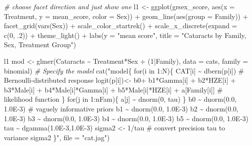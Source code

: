 \documentclass[12pt]{article}
\newenvironment{Shaded}{\begin{snugshade}}{\end{snugshade}}
\newcommand{\AttributeTok}[1]{\textcolor[rgb]{0.77,0.63,0.00}{#1}}
\newcommand{\CommentTok}[1]{\textcolor[rgb]{0.56,0.35,0.01}{\textit{#1}}}
\newcommand{\DecValTok}[1]{\textcolor[rgb]{0.00,0.00,0.81}{#1}}
\newcommand{\FunctionTok}[1]{\textcolor[rgb]{0.00,0.00,0.00}{#1}}
\newcommand{\NormalTok}[1]{#1}
\newcommand{\OtherTok}[1]{\textcolor[rgb]{0.56,0.35,0.01}{#1}}
\newcommand{\SpecialCharTok}[1]{\textcolor[rgb]{0.00,0.00,0.00}{#1}}
\newcommand{\StringTok}[1]{\textcolor[rgb]{0.31,0.60,0.02}{#1}}
\begin{document}
\begin{Shaded}
\begin{Highlighting}[]
\CommentTok{\# choose facet direction and just show one}
\NormalTok{l1 }\OtherTok{\textless{}{-}} \FunctionTok{ggplot}\NormalTok{(grsex\_score, }\FunctionTok{aes}\NormalTok{(}\AttributeTok{x =}\NormalTok{ Treatment, }\AttributeTok{y =}\NormalTok{ mean\_score, }\AttributeTok{color =}\NormalTok{ Sex)) }\SpecialCharTok{+}
  \FunctionTok{geom\_line}\NormalTok{(}\FunctionTok{aes}\NormalTok{(}\AttributeTok{group =}\NormalTok{ Family)) }\SpecialCharTok{+} \FunctionTok{facet\_grid}\NormalTok{(}\FunctionTok{vars}\NormalTok{(Sex)) }\SpecialCharTok{+}
  \FunctionTok{scale\_color\_startrek}\NormalTok{() }\SpecialCharTok{+}
  \FunctionTok{scale\_x\_discrete}\NormalTok{(}\AttributeTok{expand =} \FunctionTok{c}\NormalTok{(}\DecValTok{0}\NormalTok{, .}\DecValTok{2}\NormalTok{)) }\SpecialCharTok{+}
  \FunctionTok{theme\_light}\NormalTok{() }\SpecialCharTok{+}
  \FunctionTok{labs}\NormalTok{(}\AttributeTok{y =} \StringTok{"mean score"}\NormalTok{,}
       \AttributeTok{title =} \StringTok{"Cataracts by Family, Sex, Treatment Group"}\NormalTok{)}

\NormalTok{l1}
\NormalTok{mod }\OtherTok{\textless{}{-}} \FunctionTok{glmer}\NormalTok{(Cataracts }\SpecialCharTok{\textasciitilde{}}\NormalTok{ Treatment}\SpecialCharTok{*}\NormalTok{Sex }\SpecialCharTok{+}\NormalTok{ (}\DecValTok{1}\SpecialCharTok{|}\NormalTok{Family), }\AttributeTok{data =}\NormalTok{ cats, }\AttributeTok{family =}\NormalTok{ binomial)}
\CommentTok{\# Specify the model}
\FunctionTok{cat}\NormalTok{(}\StringTok{"model\{}
\StringTok{  for(i in 1:N)\{}
\StringTok{    CAT[i] \textasciitilde{} dbern(p[i])     \# Bernoulli{-}distributed response}
\StringTok{    logit(p[i])\textless{}{-} b0+ b1*Gamma[i] + b2*HZE[i] + b3*Male[i] +}
\StringTok{    b4*Male[i]*Gamma[i] + b5*Male[i]*HZE[i] + a[Family[i]]   \# likelihood function}
\StringTok{  \}}
\StringTok{  for(j in 1:nFam)\{}
\StringTok{    a[j] \textasciitilde{} dnorm(0, tau)}
\StringTok{  \}}
\StringTok{  b0 \textasciitilde{} dnorm(0.0, 1.0E{-}3)   \# vaguely informative priors}
\StringTok{  b1 \textasciitilde{} dnorm(0.0, 1.0E{-}3)}
\StringTok{  b2 \textasciitilde{} dnorm(0.0, 1.0E{-}3)}
\StringTok{  b3 \textasciitilde{} dnorm(0.0, 1.0E{-}3)}
\StringTok{  b4 \textasciitilde{} dnorm(0.0, 1.0E{-}3)}
\StringTok{  b5 \textasciitilde{} dnorm(0.0, 1.0E{-}3)}
\StringTok{  tau \textasciitilde{} dgamma(1.0E{-}3,1.0E{-}3)}
\StringTok{  sigma2 \textless{}{-} 1/tau     \# convert precision \textquotesingle{}tau\textquotesingle{} to variance \textquotesingle{}sigma2\textquotesingle{}}
\StringTok{\}"}\NormalTok{, }\AttributeTok{file =} \StringTok{"cat.jag"}\NormalTok{)}


\end{Highlighting}
\end{Shaded}
\end{document}
